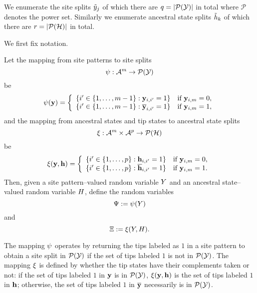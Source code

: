 We enumerate the site splits $\tilde{y}_j$ of which there are $q=|\mathcal{P}(\mathcal{Y})|$ in total where $\mathcal{P}$ denotes the power set.
Similarly we enumerate ancestral state splits $\tilde{h}_k$ of which there are $r=|\mathcal{P}(\mathcal{H})|$ in total.

We first fix notation.
\begin{definition}
Let the mapping from site patterns to site splits
\[
\psi:\mathcal{A}^m\rightarrow\mathcal{P}(\mathcal{Y})
\]
be
\[
\psi(\mathbf{y}) =
\left\{
    \begin{array}{ll}
        \{i'\in\{1,\ldots,m-1\}: \mathbf{y}_{i,i'}=1\}  & \mbox{if } \mathbf{y}_{i,m}=0,\\
        \{i'\in\{1,\ldots,m-1\}: \overline{\mathbf{y}}_{i,i'}=1\}  & \mbox{if } \mathbf{y}_{i,m}=1,
    \end{array}
\right.
\]
and the mapping from ancestral states and tip states to ancestral state splits
\[
\xi:\mathcal{A}^m\times\mathcal{A}^p\rightarrow\mathcal{P}(\mathcal{H})
\]
be
\[
\xi(\mathbf{y}, \mathbf{h}) =
\left\{
    \begin{array}{ll}
        \{i'\in\{1,\ldots,p\}: \mathbf{h}_{i,i'}=1\}  & \mbox{if } \mathbf{y}_{i,m}=0,\\
        \{i'\in\{1,\ldots,p\}: \overline{\mathbf{h}}_{i,i'}=1\}  & \mbox{if } \mathbf{y}_{i,m}=1.
    \end{array}
\right.
\]
Then, given a site pattern--valued random variable $Y$ and an ancestral state--valued random variable $H$, define the random variables
\[
\Psi := \psi(Y)
\]
and
\[
\Xi := \xi(Y, H).
\]
\end{definition}
The mapping $\psi$ operates by returning the tips labeled as $1$ in a site pattern to obtain a site split in $\mathcal{P}(\mathcal{Y})$ if the set of tips labeled $1$ is not in $\mathcal{P}(\mathcal{Y})$.
The mapping $\xi$ is defined by whether the tip states have their complements taken or not: if the set of tips labeled $1$ in $\mathbf{y}$ is in $\mathcal{P}(\mathcal{Y})$, $\xi(\mathbf{y}, \mathbf{h})$ is the set of tips labeled $1$ in $\mathbf{h}$; otherwise, the set of tips labeled $1$ in $\overline{\mathbf{y}}$ necessarily is in $\mathcal{P}(\mathcal{Y})$.

